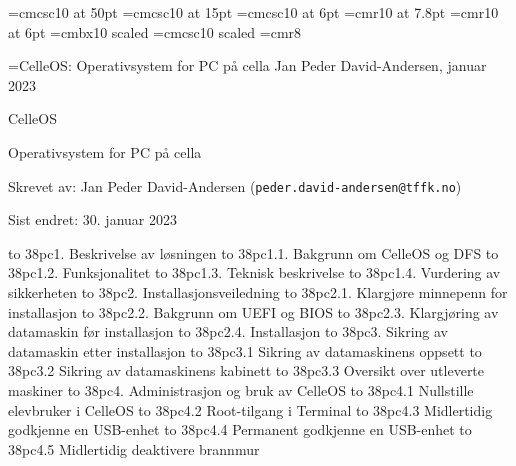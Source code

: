 



\font\ftitteltop=cmcsc10 at 50pt
\font\ftittelbottom=cmcsc10 at 15pt
\font\ftopptekst=cmcsc10 at 6pt
\font\ftopptekststor=cmr10 at 7.8pt
\font\fforfatter=cmr10 at 6pt
\font\fs=cmbx10 scaled
\font\fss=cmcsc10 scaled
\font\fc=cmr8

\def\imagewithcaption#1#2#3{
\centerline{
\vbox{\hbox{\epsfxsize #1 \epsffile{#2}}
\vskip 2pt
\hbox{\raise 4pt \vbox{\hsize=#1 \noindent \fc \baselineskip=9pt #3}}}}}

\headline={\ftopptekst CelleOS: Operativsystem for PC p\aa{} cella \hfill \fforfatter Jan Peder David-Andersen, januar 2023}

\topglue 6pc
\centerline{\ftitteltop CelleOS}
\vskip 12pt
\centerline{\ftittelbottom Operativsystem for PC p\aa{} cella}
\vskip 8pc

\noindent Skrevet av: Jan Peder David-Andersen ({\tt peder.david-andersen@tffk.no})

\noindent Sist endret: 30. januar 2023

\vskip 3pc
\def\tocwidth{38pc}


\hbox to \tocwidth{1. Beskrivelse av l\o sningen }
\smallskip
\hbox to \tocwidth{1.1. Bakgrunn om CelleOS og DFS }
\hbox to \tocwidth{1.2. Funksjonalitet }
\hbox to \tocwidth{1.3. Teknisk beskrivelse }
\hbox to \tocwidth{1.4. Vurdering av sikkerheten }
\medskip
\hbox to \tocwidth{2. Installasjonsveiledning }
\smallskip
\hbox to \tocwidth{2.1. Klargj\o re minnepenn for installasjon }
\hbox to \tocwidth{2.2. Bakgrunn om UEFI og BIOS }
\hbox to \tocwidth{2.3. Klargj\o ring av datamaskin f\o r installasjon }
\hbox to \tocwidth{2.4. Installasjon }
\medskip
\hbox to \tocwidth{3. Sikring av datamaskin etter installasjon }
\smallskip
\hbox to \tocwidth{3.1 Sikring av datamaskinens oppsett }
\hbox to \tocwidth{3.2 Sikring av datamaskinens kabinett }
\hbox to \tocwidth{3.3 Oversikt over utleverte maskiner }
\medskip
\hbox to \tocwidth{4. Administrasjon og bruk av CelleOS }
\smallskip
\hbox to \tocwidth{4.1 Nullstille elevbruker i CelleOS }
\hbox to \tocwidth{4.2 Root-tilgang i Terminal }
\hbox to \tocwidth{4.3 Midlertidig godkjenne en USB-enhet }
\hbox to \tocwidth{4.4 Permanent godkjenne en USB-enhet }
\hbox to \tocwidth{4.5 Midlertidig deaktivere brannmur }



